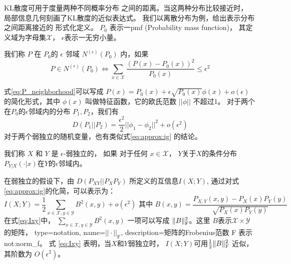 KL散度可用于度量两种不同概率分布
之间的距离。当这两种分布比较接近时，
局部信息几何刻画了KL散度的近似表达式。
我们以离散分布为例，给出表示分布之间距离接近的
形式化定义。
$P_0$ 表示一\gls{pmf} (Probability mass function)，
其定义域为字母集$\mathcal{X}$，
$\epsilon$表示一无穷小量。
\begin{definition}\label{def:eps_neighborhood}
我们称 $P$ 在 $P_0$的 $\epsilon$ 邻域 $N^{(\epsilon)}(P_0)$ 内，如果
\begin{equation}\label{eq:P_neighborhood}
P \in N^{(\epsilon)}(P_0) \iff
\sum_{x \in \mathcal{X}} \frac{(P(x) - P_0(x))^2}{P_0(x)} \leq \epsilon^2
\end{equation}
\end{definition}
式\eqref{eq:P_neighborhood}可以写成 $P(x) = P_0(x) + \epsilon
\sqrt{P_0(x)} \phi(x) + o(\epsilon)$的简化形式，其中 $\phi(x)$
叫做特征函数，它的欧氏范数 $||\phi || $ 不超过1。
对于两个在$P_0$的$\epsilon$邻域内的分布 $P_1, P_2$，我们有
\begin{equation}\label{eq:approx:ig}
D(P_1 || P_2) = \frac{\epsilon^2}{2} ||\phi_1 - \phi_2||^2 + o(\epsilon^2)
\end{equation}
对于两个弱独立的随机变量，也有类似式\eqref{eq:approx:ig}
的结论。
\begin{definition}\label{def:weak_indepedent}
我们称 $X$ 和 $Y$ 是 $\epsilon$-弱独立的，
如果 对于任何 $x \in \mathcal{X}$，
$Y$关于$X$的条件分布
$P_{Y|X}(\cdot |x)$在$Y$的$\epsilon$邻域内。
\end{definition}
在弱独立的假设下，由 $D(P_{XY}||P_XP_Y)$ 所定义的互信息$I(X;Y)$, 
通过对式\eqref{eq:approx:ig}的化简，可以表示为：
\begin{equation}\label{eq:Ixy}
I(X;Y) = \frac{1}{2}\sum_{x\in \mathcal{X}, y\in \mathcal{Y}} B^2(x,y) + o(\epsilon^2)
\textrm{ 其中 }  B(x,y)=\frac{P_{X,Y}(x,y) - P_X(x) P_Y(y)}{\sqrt{P_X(x)P_Y(y)}}
\end{equation}
在式\eqref{eq:Ixy}中， $\sum_{x\in \mathcal{X}, y\in \mathcal{Y}} B^2(x,y)$
一项可以写成 $\lVert B\rVert_{\mathrm{F}}^2$。这里 $B$表示$\mathcal{X} \times \mathcal{Y}$的矩阵，
{
  type=notation,
  name={$||\cdot||_{\mathrm{F}}$},
  description={矩阵的Frobenius范数}
}
F 表示\glsdesc{not:norm_f}。
式 \eqref{eq:Ixy} 表明，当$X$和$Y$弱独立时，
$I(X;Y)$可用$\frac{1}{2} \lVert B\rVert_{\mathrm{F}}^2$
近似，其阶数为 $O(\epsilon^2)$。

